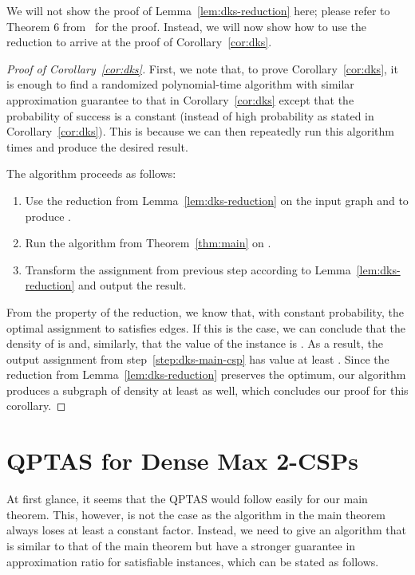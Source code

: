 \documentclass{article}
\begin{document}
We will not show the proof of Lemma~\ref{lem:dks-reduction} here; please refer to Theorem 6 from~\cite{CHK} for the proof. Instead, we will now show how to use the reduction to arrive at the proof of Corollary~\ref{cor:dks}.

\begin{proof}[Proof of Corollary~\ref{cor:dks}]
  First, we note that, to prove Corollary~\ref{cor:dks}, it is enough to find a randomized polynomial-time algorithm with similar approximation guarantee to that in Corollary~\ref{cor:dks} except that the probability of success is a constant (instead of high probability as stated in Corollary~\ref{cor:dks}). This is because we can then repeatedly run this algorithm  times and produce the desired result.

  The algorithm proceeds as follows:
  \begin{enumerate}
    \item Use the reduction from Lemma~\ref{lem:dks-reduction} on the input graph  and  to produce .
    \item Run the algorithm from Theorem~\ref{thm:main} on . \label{step:dks-main-csp}
    \item Transform the assignment from previous step according to Lemma~\ref{lem:dks-reduction} and output the result.
  \end{enumerate}

  From the property of the reduction, we know that, with constant probability, the optimal assignment to  satisfies  edges. If this is the case, we can conclude that the density of  is  and, similarly, that the value of the instance is . As a result, the output assignment from step~\ref{step:dks-main-csp} has value at least . Since the reduction from Lemma~\ref{lem:dks-reduction} preserves the optimum, our algorithm produces a subgraph of density at least  as well, which concludes our proof for this corollary.
\end{proof}

\section{QPTAS for Dense Max 2-CSPs}

At first glance, it seems that the QPTAS would follow easily for our main theorem. This, however, is not the case as the algorithm in the main theorem always loses at least a constant factor. Instead, we need to give an algorithm that is similar to that of the main theorem but have a stronger guarantee in approximation ratio for satisfiable instances, which can be stated as follows. \\
\end{document}
